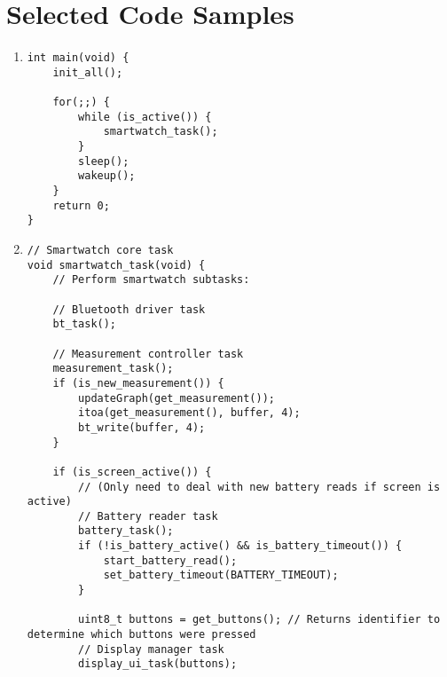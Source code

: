 \chapter{Selected Code Samples}	%


\begin{enumerate}[label=\textbf{S.\arabic*},ref=S.\arabic*{ of Appendix A}]

\item \label{main}
\begin{adjustwidth}{-2em}{0pt}
\singlespacing
\nl
\begin{lstlisting}
int main(void) {
    init_all();

    for(;;) {
        while (is_active()) {
            smartwatch_task();
        }
        sleep();
        wakeup();
    }
    return 0;
}
\end{lstlisting}
\end{adjustwidth}
\doublespacing


\item \label{smartwatch_task}
\begin{adjustwidth}{-2em}{0pt}
\singlespacing
\nl
\begin{lstlisting}
// Smartwatch core task
void smartwatch_task(void) {
    // Perform smartwatch subtasks:

    // Bluetooth driver task
    bt_task();

    // Measurement controller task
    measurement_task();
    if (is_new_measurement()) {
        updateGraph(get_measurement());
        itoa(get_measurement(), buffer, 4);
        bt_write(buffer, 4);
    }

    if (is_screen_active()) {
        // (Only need to deal with new battery reads if screen is active)
        // Battery reader task
        battery_task();
        if (!is_battery_active() && is_battery_timeout()) {
            start_battery_read();
            set_battery_timeout(BATTERY_TIMEOUT);
        }

        uint8_t buttons = get_buttons(); // Returns identifier to determine which buttons were pressed
        // Display manager task
        display_ui_task(buttons);


\end{lstlisting}
\end{adjustwidth}
\end{enumerate}
